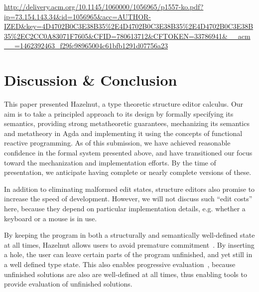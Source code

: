 \documentclass[preprint,9pt]{sigplanconf}
\begin{document}

 \url{http://delivery.acm.org/10.1145/1060000/1056965/p1557-ko.pdf?ip=73.154.143.34&id=1056965&acc=AUTHOR-IZED&key=4D4702B0C3E38B35%2E4D4702B0C3E38B35%2E4D4702B0C3E38B35%2EC2CC0A83071F7605&CFID=780613712&CFTOKEN=33786941&__acm__=1462392463_f29fc98965004c61bfb1291d07756a23}

%
%



\section{Discussion \& Conclusion}
\label{sec:future}
This paper presented Hazelnut, a type theoretic structure editor calculus. Our aim is to take a principled approach to its design by formally specifying its semantics, providing strong metatheoretic guarantees, mechanizing its semantics and metatheory in Agda and implementing it using the concepts of  functional reactive programming. As of this submission, we have achieved reasonable confidence in the formal system presented above, and have transitioned our focus toward the mechanization and implementation efforts. By the time of presentation, we anticipate having complete or nearly complete versions of these.

In addition to eliminating malformed edit states, structure editors also promise to increase the speed of development. However, we will not discuss such ``edit costs'' here, because they depend on particular implementation details, e.g. whether a keyboard or a mouse is in use.

By keeping the program in both a structurally and semantically well-defined state at all times, Hazelnut allows users to avoid premature commitment~\cite{green1996usability}.  
By inserting a hole, the user can leave certain parts of the program unfinished,  and yet still in a well defined type state. 
This also enables progressive evaluation~\cite{green1996usability}, because unfinished solutions are also are well-defined at all times, thus enabling tools to provide evaluation of unfinished solutions. 
\end{document}
